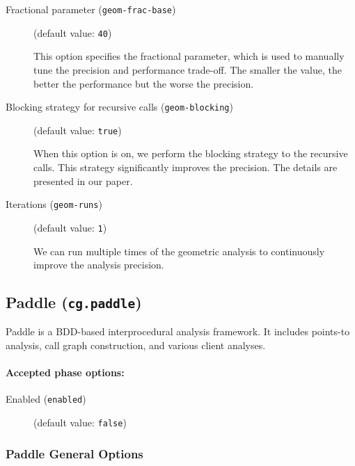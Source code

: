 \documentclass{article}
\begin{document}
\begin{description}
\item[Fractional parameter ({\tt geom-frac-base})]
(default value: {\tt 40})




						    This option specifies the fractional parameter, which is used to manually tune the precision and performance trade-off. The smaller the value, the better the performance but the worse the precision.
						  


\item[Blocking strategy for recursive calls ({\tt geom-blocking})]
(default value: {\tt true})




						    When this option is on, we perform the blocking strategy to the recursive calls. This strategy significantly improves the precision. The details are presented in our paper.
						  


\item[Iterations ({\tt geom-runs})]
(default value: {\tt 1})




						    We can run multiple times of the geometric analysis to continuously improve the analysis precision.
						  


\end{description}

\subsection{Paddle ({\tt cg.paddle})}
Paddle is a BDD-based interprocedural analysis framework. It includes points-to analysis, call graph construction, and various client analyses.

\paragraph{Accepted phase options:} 

\begin{description}

\item[Enabled ({\tt enabled})]
(default value: {\tt false})






\end{description}

\subsubsection{Paddle General Options}
\end{document}
